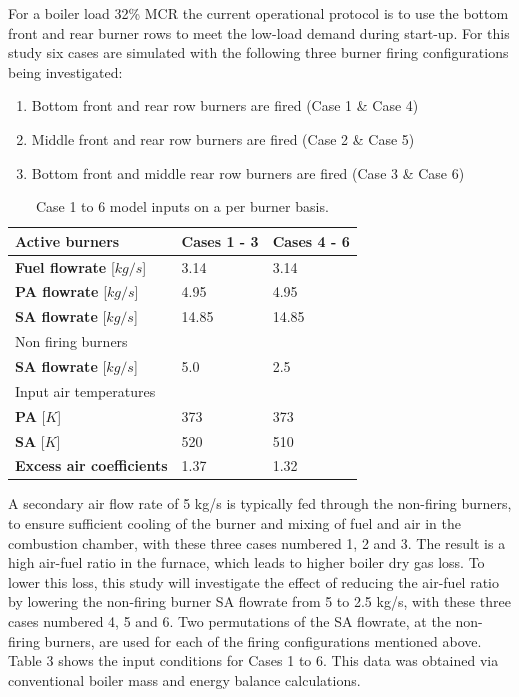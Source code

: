 \documentclass[11pt,cleanfoot]{asme2ej}
\begin{document}
For a boiler load 32\% MCR the current operational protocol is to use the bottom front and rear burner rows to meet the low-load demand during start-up.  For this study six cases are simulated with the following three burner firing configurations being investigated:
\newpage
\begin{enumerate}
\item Bottom front and rear row burners are fired (Case 1 \& Case 4)
\item Middle front and rear row burners are fired (Case 2 \& Case 5)
\item Bottom front and middle rear row burners are fired (Case 3 \& Case 6)
\end{enumerate}
\begin{table}[h!]
\centering
\caption{Case 1 to 6 model inputs on a per burner basis.}
\label{tbl_case_inputs}
\vspace{2mm}
{\tabulinesep=1.2mm
\begin{tabularx}{0.7\textwidth}{p{} p{} l}
\hline
Active burners & \textbf{Cases 1 - 3} & \textbf{Cases 4 - 6}\\
\hline
\textbf{Fuel flowrate} [$kg/s$]&3.14  &3.14\\
\textbf{PA flowrate} [$kg/s$]&4.95  &4.95\\
\textbf{SA flowrate} [$kg/s$]&14.85  &14.85\\
\hline
Non firing burners &  & \\
\hline
\textbf{SA flowrate} [$kg/s$]&5.0  &2.5\\
\hline
Input air temperatures& &\\
\hline
\textbf{PA} [$K$]&373  &373\\
\textbf{SA} [$K$]&520  &510\\
\hline
\textbf{Excess air coefficients} & 1.37 & 1.32\\
\hline
\end{tabularx}}
\vspace{0pt}
\end{table}

A secondary air flow rate of 5 kg/s is typically fed through the non-firing burners, to ensure sufficient cooling of the burner and mixing of fuel and air in the combustion chamber, with these three cases numbered 1, 2 and 3. The result is a high air-fuel ratio in the furnace, which leads to higher boiler dry gas loss. To lower this loss, this study will investigate the effect of reducing the air-fuel ratio by lowering the non-firing burner SA flowrate from 5 to 2.5 kg/s, with these three cases numbered 4, 5 and 6. Two permutations of the SA flowrate, at the non-firing burners, are used for each of the firing configurations mentioned above. Table 3 shows the input conditions for Cases 1 to 6. This data was obtained via conventional boiler mass and energy balance calculations.
\end{document}
